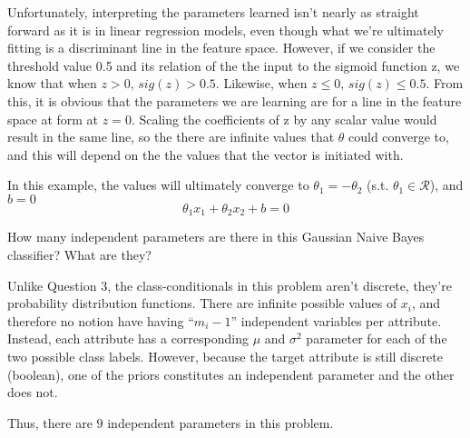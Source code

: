 \documentclass[11pt,largemargins]{homework}
\begin{document}
Unfortunately, interpreting the parameters learned isn't nearly as straight forward as it is in linear regression models, even though what we're ultimately fitting is a discriminant line in the feature space. However, if we consider the threshold value 0.5 and its relation of the the input to the sigmoid function z, we know that when $z > 0,\,sig(z) > 0.5$. Likewise, when $z\leq 0, \, sig(z) \leq 0.5$. From this, it is obvious that the parameters we are learning are for a line in the feature space at form at $z=0$. Scaling the coefficients of z by any scalar value would result in the same line, so the there are infinite values that $\theta$ could converge to, and this will depend on the the values that the vector is initiated with.

In this example, the values will ultimately converge to $\theta_1=-\theta_2$ (s.t. $\theta_1\in\mathcal{R}$), and $b=0$
$$\theta_1x_1+\theta_2x_2+b=0$$

\begin{alphaparts}
	\questionpart
	How many independent parameters are there in this Gaussian Naive Bayes classifier? What are they?

	Unlike Question 3, the class-conditionals in this problem aren't discrete, they're probability distribution functions. There are infinite possible values of $x_i$, and therefore no notion have having ``$m_i-1$'' independent variables per attribute. Instead, each attribute has a corresponding $\mu$ and $\sigma^2$ parameter for each of the two possible class labels. However, because the target attribute is still discrete (boolean), one of the priors constitutes an independent parameter and the other does not.

	Thus, there are $9$ independent parameters in this problem.




\end{alphaparts}
\end{document}
